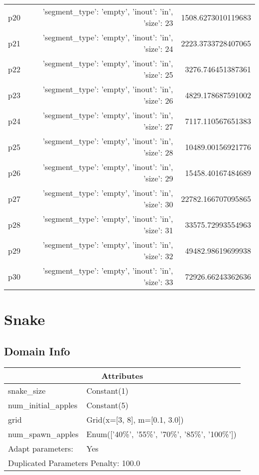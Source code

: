 \documentclass{article}
\begin{document}
\begin{center}
\begin{tabular}{r|r|r}
  p20&{'segment\_type': 'empty', 'inout': 'in', 'size': 23}&1508.6273010119683\\
  p21&{'segment\_type': 'empty', 'inout': 'in', 'size': 24}&2223.3733728407065\\
  p22&{'segment\_type': 'empty', 'inout': 'in', 'size': 25}&3276.746451387361\\
  p23&{'segment\_type': 'empty', 'inout': 'in', 'size': 26}&4829.178687591002\\
  p24&{'segment\_type': 'empty', 'inout': 'in', 'size': 27}&7117.110567651383\\
  p25&{'segment\_type': 'empty', 'inout': 'in', 'size': 28}&10489.00156921776\\
  p26&{'segment\_type': 'empty', 'inout': 'in', 'size': 29}&15458.40167484689\\
  p27&{'segment\_type': 'empty', 'inout': 'in', 'size': 30}&22782.166707095865\\
  p28&{'segment\_type': 'empty', 'inout': 'in', 'size': 31}&33575.72993554963\\
  p29&{'segment\_type': 'empty', 'inout': 'in', 'size': 32}&49482.98619699938\\
  p30&{'segment\_type': 'empty', 'inout': 'in', 'size': 33}&72926.66243362636
                            \end{tabular}
                            \end{center}
                    
                            \newpage \section{Snake}
                    \subsection*{Domain Info}

                    \begin{center}
                    \begin{tabular}{p{}p{}}
                    \multicolumn{2}{c}{\bf \large Attributes}\\\midrule
                    snake\_size & Constant(1)\\
num\_initial\_apples & Constant(5)\\
grid & Grid(x=[3, 8], m=[0.1, 3.0])\\
num\_spawn\_apples & Enum(['40\%', '55\%', '70\%', '85\%', '100\%'])
                    
                    \\\midrule
                    Adapt parameters: & Yes
                
                     \\\midrule
                    \multicolumn{2}{l}{Duplicated Parameters Penalty: 100.0}
                    \end{tabular}
                    \end{center}
                
\end{document}
